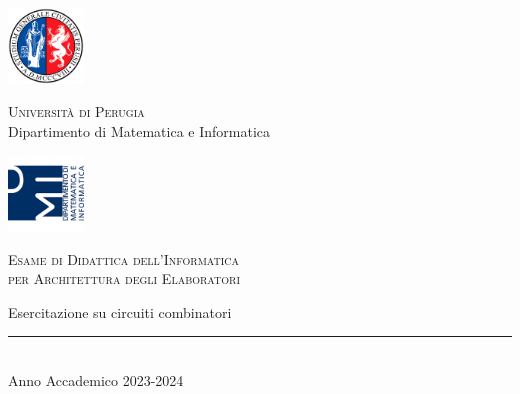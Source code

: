 
\thispagestyle{empty} %

\noindent %
\includegraphics[width=0.15\textwidth]{img/logoUniPg}
\begin{minipage}[b]{0.7\textwidth}
	\centering
	{\Large {\textsc{Universit{\`a} di Perugia}}}\\
	\vspace{0.4 em}
	{\large {Dipartimento di Matematica e Informatica}}
	\vspace{0.6 em}
\end{minipage}%
\includegraphics[width=0.15\textwidth]{img/logoDMI}

\vspace{5 em}

\begin{center}
	
	{\large {\textsc{Esame di Didattica dell'Informatica \\per Architettura degli Elaboratori}}}
	\vspace{8 em}
	
	{\Huge {Esercitazione su circuiti combinatori}}
	\vspace{10 em}
	

	
	\vspace{6 em}
	\vfill
	
	{\rule{380pt}{.4pt}}\\
	\vspace{1.2 em}
	\large{{Anno Accademico 2023-2024}}		
	
	
\end{center}
